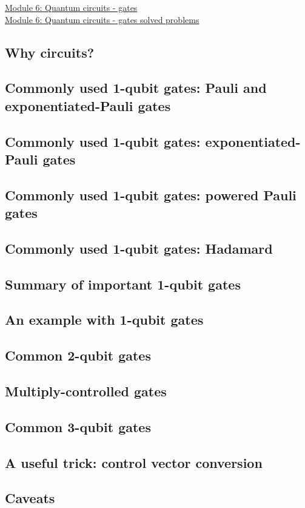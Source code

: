 \documentclass[main.tex]{subfiles}
\begin{document}
\href{https://www2.seas.gwu.edu/~simhaweb/quantum/modules/module5/module5.html}{Module 6: Quantum circuits - gates}\\
\href{https://www2.seas.gwu.edu/~simhaweb/quantum/modules/module6/problems6.html}{Module 6: Quantum circuits - gates solved problems}

\subsection{Why circuits?}

\subsection{Commonly used 1-qubit gates: Pauli and exponentiated-Pauli gates}

\subsection{Commonly used 1-qubit gates: exponentiated-Pauli gates}

\subsection{Commonly used 1-qubit gates: powered Pauli gates}

\subsection{Commonly used 1-qubit gates: Hadamard}

\subsection{Summary of important 1-qubit gates}

\subsection{An example with 1-qubit gates}

\subsection{Common 2-qubit gates}

\subsection{Multiply-controlled gates}

\subsection{Common 3-qubit gates}

\subsection{A useful trick: control vector conversion}

\subsection{Caveats}
\end{document}

